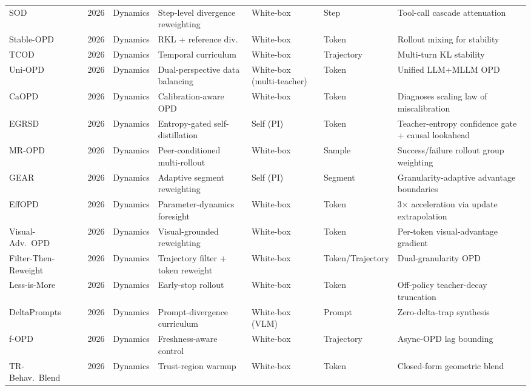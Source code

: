 \documentclass{article} %
\begin{document}
\begin{table}[t]
{\begin{tabular}{@{}lclllll@{}}
        SOD~\citep{2605.07725} & 2026 & Dynamics & Step-level divergence reweighting & White-box & Step & Tool-call cascade attenuation \\
        Stable-OPD~\citep{2604.08527} & 2026 & Dynamics & RKL + reference div. & White-box & Token & Rollout mixing for stability \\
        TCOD~\citep{2604.24005} & 2026 & Dynamics & Temporal curriculum & White-box & Trajectory & Multi-turn KL stability \\
        Uni-OPD~\citep{2605.03677} & 2026 & Dynamics & Dual-perspective data balancing & White-box (multi-teacher) & Token & Unified LLM+MLLM OPD \\
        CaOPD~\citep{2604.16830} & 2026 & Dynamics & Calibration-aware OPD & White-box & Token & Diagnoses scaling law of miscalibration \\
        EGRSD~\citep{2605.13255} & 2026 & Dynamics & Entropy-gated self-distillation & Self (PI) & Token & Teacher-entropy confidence gate + causal lookahead \\
        MR-OPD~\citep{2605.12652} & 2026 & Dynamics & Peer-conditioned multi-rollout & White-box & Sample & Success/failure rollout group weighting \\
        GEAR~\citep{2605.11853} & 2026 & Dynamics & Adaptive segment reweighting & Self (PI) & Segment & Granularity-adaptive advantage boundaries \\
        EffOPD~\citep{2605.11739} & 2026 & Dynamics & Parameter-dynamics foresight & White-box & Token & 3$\times$ acceleration via update extrapolation \\
        Visual-Adv.\ OPD~\citep{2605.21924} & 2026 & Dynamics & Visual-grounded reweighting & White-box & Token & Per-token visual-advantage gradient \\
        Filter-Then-Reweight~\citep{2606.02684} & 2026 & Dynamics & Trajectory filter + token reweight & White-box & Token/Trajectory & Dual-granularity OPD \\
        Less-is-More~\citep{2605.27028} & 2026 & Dynamics & Early-stop rollout & White-box & Token & Off-policy teacher-decay truncation \\
        DeltaPrompts~\citep{2605.15532} & 2026 & Dynamics & Prompt-divergence curriculum & White-box (VLM) & Prompt & Zero-delta-trap synthesis \\
        f-OPD~\citep{2605.17862} & 2026 & Dynamics & Freshness-aware control & White-box & Trajectory & Async-OPD lag bounding \\
        TR-Behav.\ Blend~\citep{2605.31159} & 2026 & Dynamics & Trust-region warmup & White-box & Token & Closed-form geometric blend \\

\end{tabular}}
\end{table}
\end{document}

